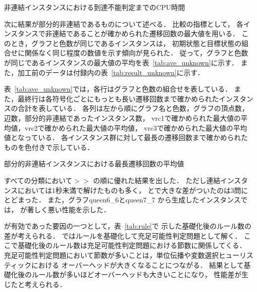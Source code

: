 \begin{table}[htbp]
  \centering
  \caption{非連結インスタンスにおける到達不能判定までのCPU時間}
  
  \label{tab:result_uncon}
\end{table}

次に結果が部分的非連結であるものについて述べる．
比較の指標として，
各インスタンスで非連結であることが確かめられた遷移回数の最大値を用いる．
このとき，グラフと色数が同じであるインスタンスは，
初期状態と目標状態の組合せに関係なく同じ程度の数値を示す傾向が見られた．
従って，グラフと色数が同じであるインスタンスの最大値の平均を表~\ref{tab:ave_unknown}に示す．
また，加工前のデータは付録内の表~\ref{tab:result_unknown}に示す．

表~\ref{tab:ave_unknown}では，各行はグラフと色数の組合せを表している．
また，最終行は各符号化ごとにもっとも長い遷移回数まで確かめられたインスタンスの合計を表している．
各列は左から順にグラフ名と色数，グラフの頂点数，辺数，部分的非連結であったインスタンス数，
vrc1で確かめられた最大値の平均値，vrc2で確かめられた最大値の平均値，
vrc3で確かめられた最大値の平均値となっている．
各インスタンス群に対して最長の遷移回数まで確かめられたものを色付きで示している．

\begin{table}[htbp]
  \centering
  \caption{部分的非連結インスタンスにおける最長遷移回数の平均値}
  
  \label{tab:ave_unknown}
\end{table}

すべての分類において$>$$>$
の順に優れた結果を出した．
ただし連結インスタンスにおいては1秒未満で解けたものも多く，
とで大きな差がついたのは3問にとどまった．
また，グラフqueen6\_6とqueen7\_7
から生成したインスタンスでは，
が著しく悪い性能を示した．

が有効であった要因の一つとして，表~\ref{tab:rule}で
示した基礎化後のルール数の差が考えられる．
{\clingo}ではルールを基礎化して充足可能性判定問題として解く．
ここで基礎化後のルール数は充足可能性判定問題における節数に関係してくる．
充足可能性判定問題において節数が多いことは，単位伝播や変数選択ヒューリスティックにおける
オーバーヘッドが大きくなることにつながる．
結果として基礎化後のルール数が多いほどオーバーヘッドも大きいことになり，
性能差が生じたと考えられる．

%

